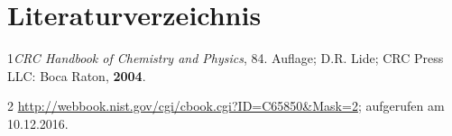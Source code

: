 \documentclass[12pt,a4paper,titlepage,headinclude,bibtotoc]{scrartcl}
\begin{document}
\section{Literaturverzeichnis}

1\quad \emph{CRC Handbook of Chemistry and Physics}, 84. Auflage; D.R. Lide; CRC Press LLC: Boca Raton, \textbf{2004}.
\vspace{0,5 cm}


2 \quad \url{http://webbook.nist.gov/cgi/cbook.cgi?ID=C65850&Mask=2}; aufgerufen am 10.12.2016.\\
\vspace{0,5 cm}










\end{document}
